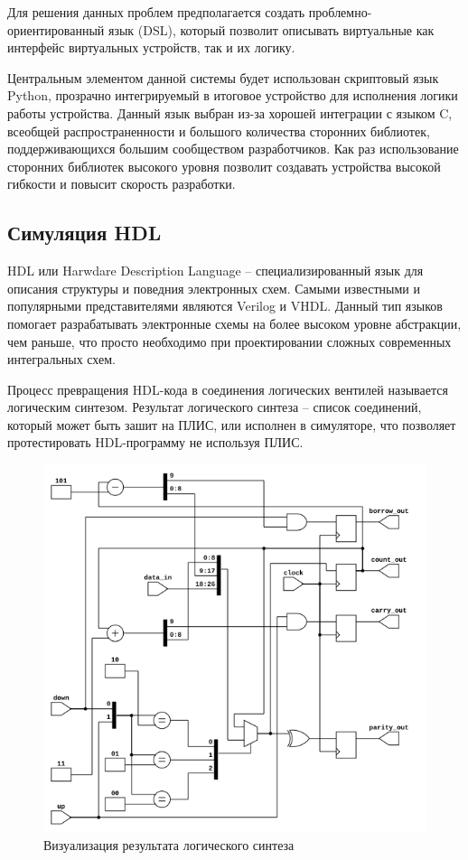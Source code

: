 Для решения данных проблем предполагается создать проблемно-ориентированный язык (DSL), который позволит
описывать виртуальные как интерфейс виртуальных устройств, так и их логику.

Центральным элементом данной системы будет использован скриптовый язык Python, прозрачно интегрируемый
в итоговое устройство для исполнения логики работы устройства.
Данный язык выбран из-за хорошей интеграции с языком C, всеобщей распространенности и большого
количества сторонних библиотек, поддерживающихся большим сообществом разработчиков.
Как раз использование сторонних библиотек высокого уровня позволит создавать устройства
высокой гибкости и повысит скорость разработки.


\subsection{Симуляция HDL}\label{sec:ch1/sec4/sub1}

HDL или Harwdare Description Language -- специализированный язык для описания структуры и поведния
электронных схем. Самыми известными и популярными представителями являются Verilog и VHDL.
Данный тип языков помогает разрабатывать электронные схемы на более высоком уровне абстракции, чем раньше,
что просто необходимо при проектировании сложных современных интегральных схем.

Процесс превращения HDL-кода в соединения логических вентилей называется логическим синтезом.
Результат логического синтеза -- список соединений, который может быть зашит на ПЛИС, или исполнен в симуляторе, что позволяет
протестировать HDL-программу не используя ПЛИС.

\begin{figure}[!htbp]
    \centering
    \begin{adjustbox}{max totalsize={0.6\textwidth}{0.6\textheight}}
        \includegraphics[]{images/netlist.png}
    \end{adjustbox}
    \caption{Визуализация результата логического синтеза}\label{fig:emu-creation-pro}
\end{figure}


